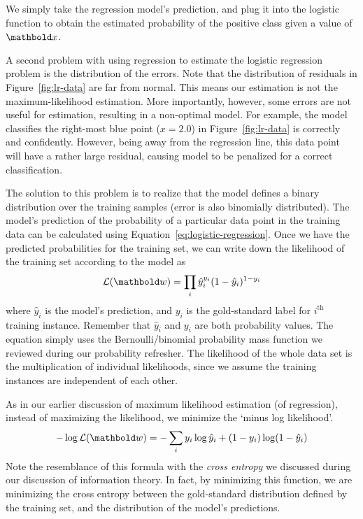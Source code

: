 We simply take the regression model's prediction,
and plug it into the logistic function to obtain
the estimated probability of the positive class given a value of $\vect{x}$.

A second problem with using regression to estimate the logistic regression problem
is the distribution of the errors.
Note that the distribution of residuals in Figure~\ref{fig:lr-data}
are far from normal.
This means our estimation is not the maximum-likelihood estimation.
More importantly, however, some errors are not useful for estimation,
resulting in a non-optimal model.
For example,
the model classifies the right-most blue point ($x=2.0$) in Figure~\ref{fig:lr-data}
is correctly and confidently.
However, being away from the regression line,
this data point will have a rather large residual,
causing model to be penalized for a correct classification.

The solution to this problem is to realize that the
model defines a binary distribution over the training samples
(error is also binomially distributed).
The model's prediction of the probability of a particular
data point in the training data can be calculated using
Equation~\ref{eq:logistic-regression}.
Once we have the predicted probabilities for the training set,
we can write down the likelihood of the training set according to the model as
\begin{equation*}
  \mathcal{L}(\vect{w}) = \prod_{i} \hat{y}_{i}^{y_{i}} (1 - \hat{y}_{i})^{1 - y_{i}}
\end{equation*}
where $\hat{y}_{i}$ is the model's prediction, and $y_{i}$ is the gold-standard label
for $i^\text{th}$ training instance.
Remember that $\hat{y}_{i}$ and $y_{i}$ are both probability values.
The equation simply uses the Bernoulli/binomial probability mass function
we reviewed during our probability refresher.
The likelihood of the whole data set is the multiplication of individual likelihoods,
since we assume the training instances are independent of each other.

As in our earlier discussion of maximum likelihood estimation (of regression),
instead of maximizing the likelihood, we minimize the `minus log likelihood'.%
\begin{equation}\label{eq:lr-loglikelihood}
  \begin{aligned}
       -\log \mathcal{L}(\vect{w}) &= 
        -\sum_{i} {y_{i}} \log \hat{y}_{i} + (1 - y_{i}) \log (1 - \hat{y}_{i})\\
  \end{aligned}
\end{equation}
Note the resemblance of this formula with the \emph{cross entropy}
we discussed during our discussion of information theory.
In fact, by minimizing this function,
we are minimizing the cross entropy between the gold-standard distribution defined by the training set,
and the distribution of the model's predictions.

